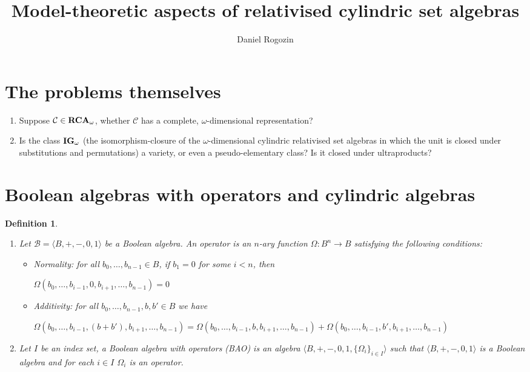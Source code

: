 \documentclass[a4paper]{article}
\author{Daniel Rogozin}
\date{}
\title{Model-theoretic aspects of relativised cylindric set algebras}
\theoremstyle{defin}
\newtheorem{defin}{Definition}
\theoremstyle{theorem}
\theoremstyle{prop}
\theoremstyle{lemma}
\theoremstyle{fact}
\theoremstyle{ex}
\theoremstyle{col}
\begin{document}
\maketitle

\nocite{*}

\section{The problems themselves}

\begin{enumerate}
\item Suppose $\mathcal{C} \in {\bf RCA}_{\omega}$, whether $\mathcal{C}$ has a complete, $\omega$-dimensional representation?
\item Is the class ${\bf IG}_{\omega}$ (the isomorphism-closure of the $\omega$-dimensional cylindric relativised set algebras in which the unit is closed under substitutions and permutations) a variety, or even
a pseudo-elementary class? Is it closed under ultraproducts?
\end{enumerate}

\section{Boolean algebras with operators and cylindric algebras}

\begin{defin}

$ $

  \begin{enumerate}
    \item Let $\mathcal{B} = \langle B, +, -, 0, 1 \rangle$ be a Boolean algebra. An operator is an $n$-ary function $\Omega : B^n \to B$ satisfying the following conditions:
    \begin{itemize}
      \item Normality: for all $b_0, \dots, b_{n - 1} \in B$, if $b_1 = 0$ for some $i < n$, then

\begin{center}
      $\Omega(b_0, \dots, b_{i - 1}, 0, b_{i+1}, \dots, b_{n - 1}) = 0$
\end{center}
      \item Additivity: for all $b_0, \dots, b_{n - 1}, b, b' \in B$ we have
      \begin{center}
        $\Omega(b_0, \dots, b_{i - 1}, (b + b'), b_{i+1}, \dots, b_{n - 1}) = \Omega(b_0, \dots, b_{i - 1}, b, b_{i+1}, \dots, b_{n - 1}) + \Omega(b_0, \dots, b_{i - 1}, b', b_{i+1}, \dots, b_{n - 1})$
      \end{center}
    \end{itemize}
    \item Let $I$ be an index set, a Boolean algebra with operators (BAO) is an algebra $\langle B, +, -, 0, 1, \{ \Omega_{i} \}_{i \in I} \rangle$ such that $\langle B, +, -, 0, 1 \rangle$ is a Boolean algebra and for each $i \in I$ $\Omega_{i}$ is an operator.
  \end{enumerate}
\end{defin}
\end{document}
